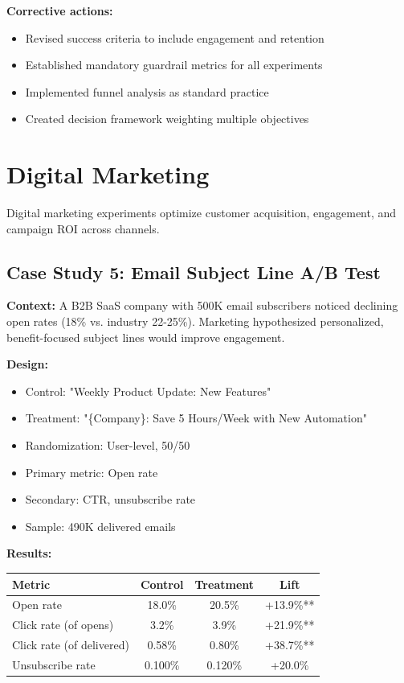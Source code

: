 \textbf{Corrective actions:}
\begin{itemize}
    \item Revised success criteria to include engagement and retention
    \item Established mandatory guardrail metrics for all experiments
    \item Implemented funnel analysis as standard practice
    \item Created decision framework weighting multiple objectives
\end{itemize}

\section{Digital Marketing}

Digital marketing experiments optimize customer acquisition, engagement, and campaign ROI across channels.

\subsection{Case Study 5: Email Subject Line A/B Test}

\textbf{Context:} A B2B SaaS company with 500K email subscribers noticed declining open rates (18\% vs. industry 22-25\%). Marketing hypothesized personalized, benefit-focused subject lines would improve engagement.

\textbf{Design:}
\begin{itemize}
    \item Control: "Weekly Product Update: New Features"
    \item Treatment: "\{Company\}: Save 5 Hours/Week with New Automation"
    \item Randomization: User-level, 50/50
    \item Primary metric: Open rate
    \item Secondary: CTR, unsubscribe rate
    \item Sample: 490K delivered emails
\end{itemize}

\textbf{Results:}
\begin{center}
\begin{tabular}{lccc}
\toprule
\textbf{Metric} & \textbf{Control} & \textbf{Treatment} & \textbf{Lift} \\
\midrule
Open rate & 18.0\% & 20.5\% & +13.9\%** \\
Click rate (of opens) & 3.2\% & 3.9\% & +21.9\%** \\
Click rate (of delivered) & 0.58\% & 0.80\% & +38.7\%** \\
Unsubscribe rate & 0.100\% & 0.120\% & +20.0\% \\
\bottomrule
\end{tabular}
\end{center}

